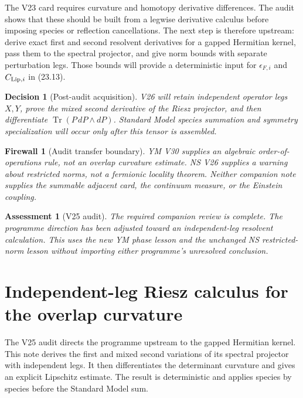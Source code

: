 \documentclass[11pt]{article}
\newtheorem{assessment}[theorem]{Assessment}
\newtheorem{firewall}[theorem]{Firewall}
\newtheorem{decision}[theorem]{Decision}
\newcommand{\Tr}{\operatorname{Tr}}
\begin{document}
The V23 card requires curvature and homotopy derivative differences.
The audit shows that these should be built from a legwise derivative
calculus before imposing species or reflection cancellations.  The next
step is therefore upstream: derive exact first and second resolvent
derivatives for a gapped Hermitian kernel, pass them to the spectral
projector, and give norm bounds with separate perturbation legs.  Those
bounds will provide a deterministic input for
\(\epsilon_{F,i}\) and \(C_{{\rm Lip},i}\) in (23.13).

\begin{decision}[Post-audit acquisition]
\label{dec:v11v25-next}
V26 will retain independent operator legs
\(X,Y\), prove the mixed second derivative of the Riesz projector, and
then differentiate
\(\Tr(P\,dP\wedge dP)\).  Standard Model species summation and symmetry
specialization will occur only after this tensor is assembled.
\end{decision}

\begin{firewall}[Audit transfer boundary]
\label{fw:v11v25-boundary}
YM V30 supplies an algebraic order-of-operations rule, not an overlap
curvature estimate.  NS V26 supplies a warning about restricted norms,
not a fermionic locality theorem.  Neither companion note supplies the
summable adjacent card, the continuum measure, or the Einstein coupling.
\end{firewall}

\begin{assessment}[V25 audit]
\label{ass:v11v25}
The required companion review is complete.  The programme direction has
been adjusted toward an independent-leg resolvent calculation.  This
uses the new YM phase lesson and the unchanged NS restricted-norm lesson
without importing either programme's unresolved conclusion.
\end{assessment}
\section{Independent-leg Riesz calculus for the overlap curvature}
\label{sec:v11v26}

The V25 audit directs the programme upstream to the gapped Hermitian
kernel.  This note derives the first and mixed second variations of its
spectral projector with independent legs.  It then differentiates the
determinant curvature and gives an explicit Lipschitz estimate.  The
result is deterministic and applies species by species before the
Standard Model sum.
\end{document}
